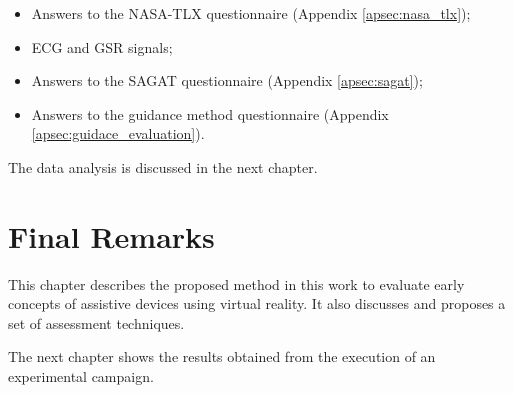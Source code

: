 \begin{itemize}
    \item Answers to the NASA-TLX questionnaire (Appendix \ref{apsec:nasa_tlx});
    \item ECG and GSR signals;
    \item Answers to the SAGAT questionnaire (Appendix \ref{apsec:sagat});
    \item Answers to the guidance method questionnaire (Appendix \ref{apsec:guidace_evaluation}).
\end{itemize}

The data analysis is discussed in the next chapter.

\section{Final Remarks}

This chapter describes the proposed method in this work to evaluate early concepts of assistive devices using virtual reality. It also discusses and proposes a set of assessment techniques. 

The next chapter shows the results obtained from the execution of an experimental campaign.